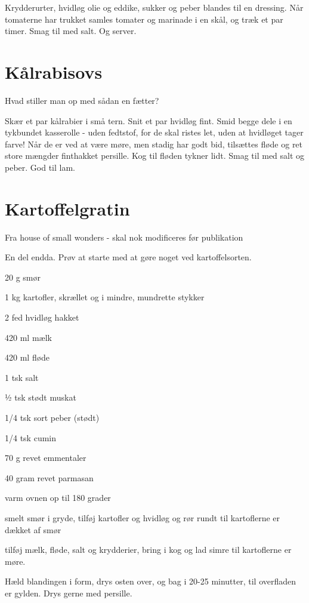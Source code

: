 \documentclass[
]{book}
\begin{document}
Krydderurter, hvidløg olie og eddike, sukker og peber blandes til en dressing. Når tomaterne har trukket samles tomater og marinade i en skål, og træk et par timer. Smag til med salt. Og server.

\hypertarget{kuxe5lrabisovs}{%
\section{Kålrabisovs}\label{kuxe5lrabisovs}}

Hvad stiller man op med sådan en fætter?

Skær et par kålrabier i små tern.
Snit et par hvidløg fint.
Smid begge dele i en tykbundet kasserolle - uden fedtstof, for de skal
ristes let, uden at hvidløget tager farve!
Når de er ved at være møre, men stadig har godt bid, tilsættes fløde og ret store
mængder finthakket persille. Kog til fløden tykner lidt. Smag til med salt og
peber. God til lam.

\hypertarget{kartoffelgratin}{%
\section{Kartoffelgratin}\label{kartoffelgratin}}

Fra house of small wonders - skal nok modificeres før publikation

En del endda. Prøv at starte med at gøre noget ved kartoffelsorten.

20 g smør

1 kg kartofler, skrællet og i mindre, mundrette stykker

2 fed hvidløg hakket

420 ml mælk

420 ml fløde

1 tsk salt

½ tsk stødt muskat

1/4 tsk sort peber (stødt)

1/4 tsk cumin

70 g revet emmentaler

40 gram revet parmasan

varm ovnen op til 180 grader

smelt smør i gryde, tilføj kartofler og hvidløg og rør rundt til kartoflerne er dækket af smør

tilføj mælk, fløde, salt og krydderier, bring i kog og lad simre til kartoflerne er møre.

Hæld blandingen i form, drys osten over, og bag i 20-25 minutter, til overfladen er gylden. Drys gerne med persille.
\end{document}
